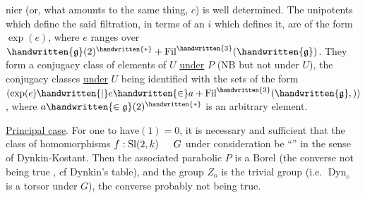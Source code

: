 nier (or, what amounts to the same thing, $c$) is well determined. The unipotents which define the said filtration, in terms of an $i$ which defines it, are  of the form $\exp(e)$, where $e$ ranges over $\handwritten{\mathfrak{g}}(2)^{\handwritten{*}}+\operatorname{Fil}^{\handwritten{3}}(\handwritten{\mathfrak{g}})$. They form a conjugacy class of elements of $U$ \uline{under} $P$ (NB but not under $U$), the conjugacy classes \uline{under} $U$ being identified with the sets of the form $(\exp(e)\handwritten{\mid}e\handwritten{\in}a+\operatorname{Fil}^{\handwritten{3}}(\handwritten{\mathfrak{g}},))$, where $a\handwritten{\in\mathfrak{g}}(2)^{\handwritten{*}}$ is an arbitrary element.

\uline{Principal case}. For one to have\hspace{1.5em}$(1)=0$, it is necessary and sufficient that  the class of homomorphisms $f:\operatorname{Sl}(2,k)\hspace{1.5em}G$ under consideration be ``'' in the sense of Dynkin-Kostant. Then the associated parabolic $P$ is a Borel (the converse not being true , cf Dynkin's table), and the group $Z_o$ is the trivial group (i.e. $\operatorname{Dyn}_c$ is a torsor under $G$), the converse probably not being true.
